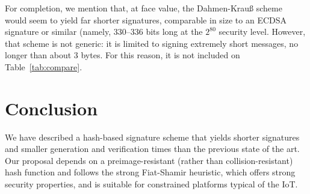 \documentclass[11pt]{llncs}
\begin{document}

For completion, we mention that, at face value, the Dahmen-{Krau\ss} scheme~\cite{dahmen-krauss} would seem to yield far shorter signatures, comparable in size to an ECDSA signature or similar (namely, 330--336 bits long at the $2^{80}$ security level. However, that scheme is not generic: it is limited to signing extremely short messages, no longer than about 3 bytes. For this reason, it is not included on Table~\ref{tab:compare}.

\section{Conclusion}\label{sec:conclusion}

We have described a hash-based signature scheme that yields shorter signatures and smaller generation and verification times than the previous state of the art. Our proposal depends on a preimage-resistant (rather than collision-resistant) hash function and follows the strong Fiat-Shamir heuristic, which offers strong security properties, and is suitable for constrained platforms typical of the IoT.



\end{document}
